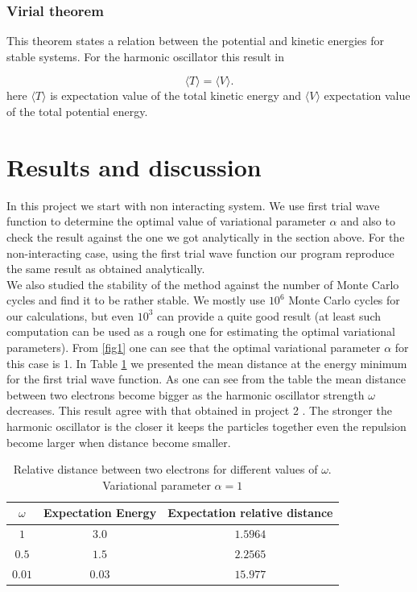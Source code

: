 \documentclass[10pt]{article}
\begin{document}
\subsubsection{Virial theorem}
This theorem states a relation between the potential and kinetic energies for stable systems. For the harmonic oscillator this result in 

\begin{equation*}
  \langle T \rangle= \langle V \rangle.
  \end{equation*}
here $\langle T \rangle$ is expectation value of the total kinetic energy and   $\langle V \rangle$ expectation value of the total potential energy.

\newpage
\section{Results and discussion}\label{results}

In this project we start with non interacting system. We use first trial wave function to determine the optimal value of variational parameter $\alpha$ and also to check the result against the one we got analytically in the section above. For the non-interacting case, using the first trial wave function our program reproduce the same result as obtained analytically. \\
We also studied the stability of the method against the number of Monte Carlo cycles and find it to be rather stable. We mostly use $10^6$ Monte Carlo cycles for our calculations, but even  $10^3$ can provide a quite good result (at least such computation can be used as a rough one for estimating the optimal variational parameters). 
From \ref{fig1} one can see that the optimal variational parameter $\alpha$ for this case is 1. In Table \ref{tab:one} we presented the mean distance at the energy minimum for the first trial wave function. As one can see from the table the mean distance between two electrons become bigger as the harmonic oscillator strength $\omega$ decreases. This result agree with that obtained in project 2 \cite{proj2}. The stronger the harmonic oscillator is the closer it keeps the particles together even the repulsion become larger when distance become smaller. 

\begin{table}[h!]
  \caption{Relative distance between two electrons for different values of $\omega$. Variational parameter $\alpha =1$}
  \label{tab:one}
  \begin{center}
    \begin{tabular}{c|c|c}
    \hline
		$\omega$& Expectation Energy & Expectation relative distance \\
    \hline
	$	1 $  &  $3.0$ & $1.5964$  \\
	$	0.5$   &$1.5$ & $2.2565$   \\
	$	0.01$   & $0.03$ &  $15.977$   \\
	\end{tabular}
  \end{center}
\end{table}
\end{document}
